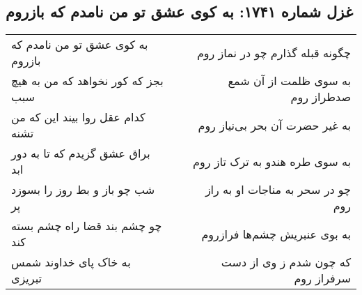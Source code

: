 \begin{center}
\section*{غزل شماره ۱۷۴۱: به کوی عشق تو من نامدم که بازروم}
\label{sec:1741}
\begin{longtable}{l p{0.5cm} r}
به کوی عشق تو من نامدم که بازروم
&&
چگونه قبله گذارم چو در نماز روم
\\
بجز که کور نخواهد که من به هیچ سبب
&&
به سوی ظلمت از آن شمع صدطراز روم
\\
کدام عقل روا بیند این که من تشنه
&&
به غیر حضرت آن بحر بی‌نیاز روم
\\
براق عشق گزیدم که تا به دور ابد
&&
به سوی طره هندو به ترک تاز روم
\\
شب چو باز و بط روز را بسوزد پر
&&
چو در سحر به مناجات او به راز روم
\\
چو چشم بند قضا راه چشم بسته کند
&&
به بوی عنبریش چشم‌ها فرازروم
\\
به خاک پای خداوند شمس تبریزی
&&
که چون شدم ز وی از دست سرفراز روم
\\
\end{longtable}
\end{center}

